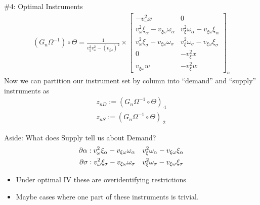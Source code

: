 \begin{frame}{\#4: Optimal Instruments}
\begin{align*}
(G_n\Omega^{-1} )\circ \Theta= \frac{1}{v_\xi^2 v_\omega^2 - (v_{\xi \omega})^2}\times \begin{bmatrix}
-v_\omega^2 x & 0 \\
v_\omega^2 \xi_\alpha - v_{\xi \omega}\omega_\alpha & v_\xi^2 \omega_\alpha - v_{\xi \omega}\xi_\alpha \\
v_\omega^2 \xi_\sigma - v_{\xi \omega}\omega_\sigma & v_\xi^2 \omega_\sigma - v_{\xi \omega}\xi_\sigma \\
0 &  -v_\xi^2 x \\
v_{\xi \omega}w & -v_\xi^2 w
\end{bmatrix}_n
\end{align*}
\noindent Now we can partition our instrument set by column into ``demand'' and ``supply'' instruments as 
\begin{align*}
z_{nD} := (G_n\Omega^{-1} \circ \Theta)_{\cdot 1} \\
z_{nS} := (G_n\Omega^{-1} \circ \Theta )_{\cdot 2} 
\end{align*}
\end{frame}

\begin{frame}{Aside: What does Supply tell us about Demand?}
\begin{align*}
\partial \alpha: v_\omega^2 \xi_\alpha - v_{\xi \omega}\omega_\alpha  \quad& v_\xi^2 \omega_\alpha - v_{\xi \omega}\xi_\alpha \\
\partial \sigma: v_\omega^2 \xi_\sigma - v_{\xi \omega}\omega_\sigma \quad& v_\xi^2 \omega_\sigma - v_{\xi \omega}\xi_\sigma 
\end{align*}
\begin{itemize}
\item Under optimal IV these are \alert{overidentifying restrictions}
\item Maybe cases where one part of these instruments is trivial.
\end{itemize}
\end{frame}


